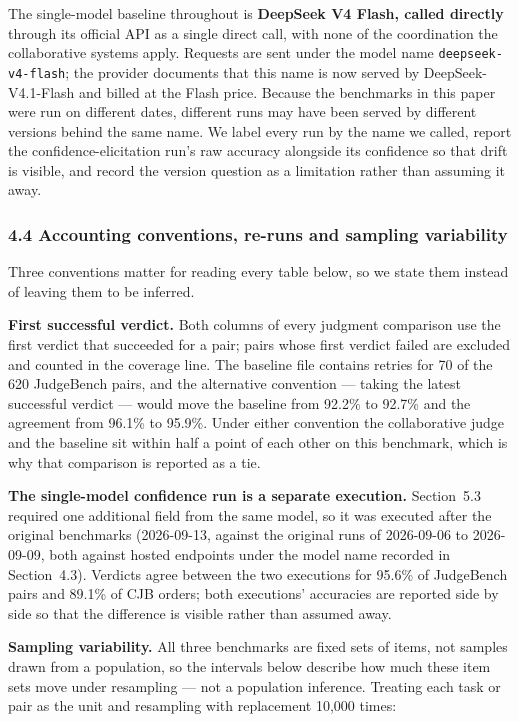 \documentclass[
]{article}
\begin{document}
The single-model baseline throughout is \textbf{DeepSeek V4 Flash, called directly}
through its official API as a single direct call, with none of the coordination the
collaborative systems apply. Requests are sent under the model name \texttt{deepseek-v4-flash};
the provider documents that this name is now served by DeepSeek-V4.1-Flash and billed at
the Flash price. Because the benchmarks in this paper were run on different dates,
different runs may have been served by different versions behind the same name. We label
every run by the name we called, report the confidence-elicitation run's raw accuracy
alongside its confidence so that drift is visible, and record the version question as a
limitation rather than assuming it away.

\subsubsection{4.4 Accounting conventions, re-runs and sampling variability}\label{conventions}

Three conventions matter for reading every table below, so we state them instead of leaving
them to be inferred.

\textbf{First successful verdict.} Both columns of every judgment comparison use the first
verdict that succeeded for a pair; pairs whose first verdict failed are excluded and counted
in the coverage line. The baseline file contains retries for 70 of the 620 JudgeBench pairs,
and the alternative convention --- taking the latest successful verdict --- would move the
baseline from 92.2\% to 92.7\% and the agreement from 96.1\% to 95.9\%. Under either
convention the collaborative judge and the baseline sit within half a point of each other on
this benchmark, which is why that comparison is reported as a tie.

\textbf{The single-model confidence run is a separate execution.} Section~5.3 required one
additional field from the same model, so it was executed after the original benchmarks
(2026-09-13, against the original runs of 2026-09-06 to 2026-09-09, both against hosted
endpoints under the model name recorded in Section~4.3). Verdicts agree between the two
executions for 95.6\% of JudgeBench pairs and 89.1\% of CJB orders; both executions'
accuracies are reported side by side so that the difference is visible rather than assumed
away.

\textbf{Sampling variability.} All three benchmarks are fixed sets of items, not samples
drawn from a population, so the intervals below describe how much these item sets move under
resampling --- not a population inference. Treating each task or pair as the unit and
resampling with replacement 10{,}000 times:
\end{document}
